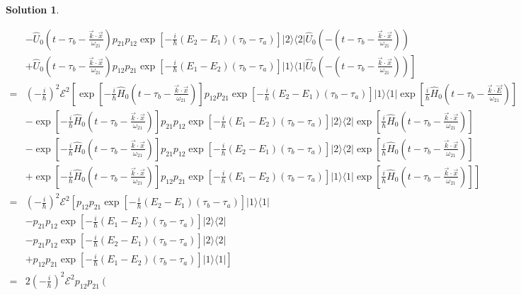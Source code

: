 \documentclass[UTF8,10pt,a4paper]{article}
\theoremstyle{Problem}
\theoremstyle{Solution}
\newtheorem*{sol}{Solution}
\begin{document}
\begin{sol}
\begin{enumerate}
\begin{align}
            \nonumber&-\hat{U}_0(t-\tau_b-\frac{\vec{k}\cdot\vec{x}}{\omega_{21}})p_{21}p_{12}\exp[-\frac{i}{\hbar}(E_2-E_1)(\tau_b-\tau_a)]\lvert 2\rangle\langle 2\rvert\hat{U}_0(-(t-\tau_b-\frac{\vec{k}\cdot\vec{x}}{\omega_{21}}))\\
            \nonumber&\left.+\hat{U}_0(t-\tau_b-\frac{\vec{k}\cdot\vec{x}}{\omega_{21}})p_{12}p_{21}\exp[-\frac{i}{\hbar}(E_1-E_2)(\tau_b-\tau_a)]\lvert 1\rangle\langle 1\rvert\hat{U}_0(-(t-\tau_b-\frac{\vec{k}\cdot\vec{x}}{\omega_{21}}))\right]\\
            \nonumber=&\left(-\frac{i}{\hbar}\right)^2\mathscr{E}^2\left[\exp[-\frac{i}{\hbar}\hat{H}_0(t-\tau_b-\frac{\vec{k}\cdot\vec{x}}{\omega_{21}})]p_{12}p_{21}\exp[-\frac{i}{\hbar}(E_2-E_1)(\tau_b-\tau_a)]\lvert 1\rangle\langle 1\rvert\exp[\frac{i}{\hbar}\hat{H}_0(t-\tau_b-\frac{\vec{k}\cdot\vec{E}}{\omega_{21}})]\right.\\
            \nonumber&-\exp[-\frac{i}{\hbar}\hat{H}_0(t-\tau_b-\frac{\vec{k}\cdot\vec{x}}{\omega_{21}})]p_{21}p_{12}\exp[-\frac{i}{\hbar}(E_1-E_2)(\tau_b-\tau_a)]\lvert 2\rangle\langle 2\rvert\exp[\frac{i}{\hbar}\hat{H}_0(t-\tau_b-\frac{\vec{k}\cdot\vec{x}}{\omega_{21}})]\\
            \nonumber&-\exp[-\frac{i}{\hbar}\hat{H}_0(t-\tau_b-\frac{\vec{k}\cdot\vec{x}}{\omega_{21}})]p_{21}p_{12}\exp[-\frac{i}{\hbar}(E_2-E_1)(\tau_b-\tau_a)]\lvert 2\rangle\langle 2\rvert\exp[\frac{i}{\hbar}\hat{H}_0(t-\tau_b-\frac{\vec{k}\cdot\vec{x}}{\omega_{21}})]\\
            \nonumber&\left.+\exp[-\frac{i}{\hbar}\hat{H}_0(t-\tau_b-\frac{\vec{k}\cdot\vec{x}}{\omega_{21}})]p_{12}p_{21}\exp[-\frac{i}{\hbar}(E_1-E_2)(\tau_b-\tau_a)]\lvert 1\rangle\langle 1\rvert\exp[\frac{i}{\hbar}\hat{H}_0(t-\tau_b-\frac{\vec{k}\cdot\vec{x}}{\omega_{21}})]\right]\\
            \nonumber=&\left(-\frac{i}{\hbar}\right)^2\mathscr{E}^2\left[p_{12}p_{21}\exp[-\frac{i}{\hbar}(E_2-E_1)(\tau_b-\tau_a)]\lvert 1\rangle\langle 1\rvert\right.\\
            \nonumber&-p_{21}p_{12}\exp[-\frac{i}{\hbar}(E_1-E_2)(\tau_b-\tau_a)]\lvert 2\rangle\langle 2\rvert\\
            \nonumber&-p_{21}p_{12}\exp[-\frac{i}{\hbar}(E_2-E_1)(\tau_b-\tau_a)]\lvert 2\rangle\langle 2\rvert\\
            \nonumber&\left.+p_{12}p_{21}\exp[-\frac{i}{\hbar}(E_1-E_2)(\tau_b-\tau_a)]\lvert 1\rangle\langle 1\rvert\right]\\
            =&2\left(-\frac{i}{\hbar}\right)^2\mathscr{E}^2p_{12}p_{21}\left(\begin{matrix}

\end{matrix}
\end{align}
\end{enumerate}
\end{sol}
\end{document}
